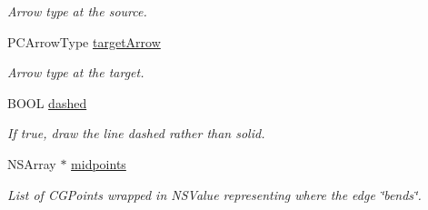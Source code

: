 \begin{Indent}
\begin{DoxyCompactItemize}
\begin{DoxyCompactList}\small\item\em Arrow type at the source. \end{DoxyCompactList}\item 
\hypertarget{interface_p_c_graph_edge_ac8a65e2a47eca59b7b57a4c698af36d6}{
PCArrowType \hyperlink{interface_p_c_graph_edge_ac8a65e2a47eca59b7b57a4c698af36d6}{targetArrow}}
\label{interface_p_c_graph_edge_ac8a65e2a47eca59b7b57a4c698af36d6}

\begin{DoxyCompactList}\small\item\em Arrow type at the target. \end{DoxyCompactList}\item 
\hypertarget{interface_p_c_graph_edge_a1d5a19c04ce09dc08aafb7db950d4297}{
BOOL \hyperlink{interface_p_c_graph_edge_a1d5a19c04ce09dc08aafb7db950d4297}{dashed}}
\label{interface_p_c_graph_edge_a1d5a19c04ce09dc08aafb7db950d4297}

\begin{DoxyCompactList}\small\item\em If true, draw the line dashed rather than solid. \end{DoxyCompactList}\item 
\hypertarget{interface_p_c_graph_edge_ac1f5a81bc719b021f7b20dd4e3d21c0e}{
NSArray $\ast$ \hyperlink{interface_p_c_graph_edge_ac1f5a81bc719b021f7b20dd4e3d21c0e}{midpoints}}
\label{interface_p_c_graph_edge_ac1f5a81bc719b021f7b20dd4e3d21c0e}

\begin{DoxyCompactList}\small\item\em List of CGPoints wrapped in NSValue representing where the edge \char`\"{}bends\char`\"{}. \end{DoxyCompactList}\end{DoxyCompactItemize}
\end{Indent}
